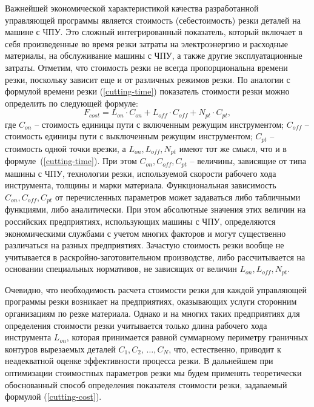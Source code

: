 \documentclass[11pt,twoside,openany]{report}
\begin{document}
Важнейшей экономической характеристикой качества
разработанной управляющей программы является стоимость
(себестоимость) резки деталей на машине с ЧПУ.
Это сложный интегрированный показатель,
который включает в себя произведенные во время
резки затраты на электроэнергию и расходные материалы,
на обслуживание машины с ЧПУ,
а также другие эксплуатационные затраты.
Отметим, что стоимость резки не всегда
пропорциональна времени резки,
поскольку зависит еще и от различных режимов резки.
По аналогии с формулой времени резки (\ref{cutting-time})
показатель стоимости резки можно определить по следующей формуле:
\begin{equation}
  F_{cost}=
  L_{on} \cdot C_{on} +
  L_{off} \cdot C_{off} +
  N_{pt} \cdot C_{pt}
  ,
  \label{cutting-cost}
\end{equation}
где
$C_{on}$ -- стоимость единицы пути с включенным режущим инструментом;
$C_{off}$ -- стоимость единицы пути с выключенным режущим инструментом;
$C_{pt}$ -- стоимость одной точки врезки,
а $L_{on}, L_{off}, N_{pt}$
имеют тот же смысл, что и в формуле~(\ref{cutting-time}).
При этом $C_{on}, C_{off}, C_{pt}$ --
величины, зависящие от типа машины с ЧПУ,
технологии резки, используемой скорости рабочего хода инструмента,
толщины и марки материала.
Функциональная зависимость
$C_{on}, C_{off}, C_{pt}$
от перечисленных параметров
может задаваться либо табличными функциями,
либо аналитически.
При этом абсолютные значения этих величин
на российских предприятиях, использующих машины с ЧПУ,
определяются экономическими службами с учетом многих факторов
и могут существенно различаться на разных предприятиях.
Зачастую стоимость резки вообще не учитывается
в раскройно-заготовительном производстве,
либо рассчитывается на основании специальных нормативов,
не зависящих от величин
$L_{on}, L_{off}, N_{pt}$.

Очевидно, что необходимость расчета стоимости резки
для каждой управляющей программы резки возникает на предприятиях,
оказывающих услуги сторонним организациям по резке материала.
Однако и на многих таких предприятиях для определения
стоимости резки учитывается только длина рабочего хода инструмента
$L_{on}$,
которая принимается равной суммарному периметру граничных контуров вырезаемых деталей
$C_1, C_2, \,\dots, C_N$,
что, естественно, приводит к неадекватной оценке эффективности процесса резки.
В дальнейшем при оптимизации стоимостных параметров резки
мы будем применять теоретически обоснованный способ определения
показателя стоимости резки, задаваемый формулой (\ref{cutting-cost}).
\end{document}
